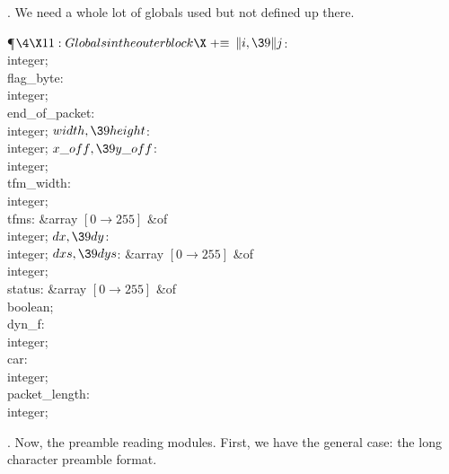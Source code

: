 . We need a whole lot of globals used but not defined up there.

\Y\P$\4\X11:Globals in the outer block\X\mathrel{+}\S$\6
\4$\|i,\39\|j$: \\{integer};\6
\4\\{flag\_byte}: \\{integer};\6
\4\\{end\_of\_packet}: \\{integer};\6
\4$\\{width},\39\\{height}$: \\{integer};\6
\4$\\{x\_off},\39\\{y\_off}$: \\{integer};\6
\4\\{tfm\_width}: \\{integer};\6
\4\\{tfms}: \&{array} $[0\to255]$ \1\&{of}\5
\\{integer};\2\6
\4$\\{dx},\39\\{dy}$: \\{integer};\6
\4$\\{dxs},\39\\{dys}$: \&{array} $[0\to255]$ \1\&{of}\5
\\{integer};\2\6
\4\\{status}: \&{array} $[0\to255]$ \1\&{of}\5
\\{boolean};\2\6
\4\\{dyn\_f}: \\{integer};\6
\4\\{car}: \\{integer};\6
\4\\{packet\_length}: \\{integer};\par
\fi

. Now, the preamble reading modules.  First, we have the general case: the
long character preamble format.

